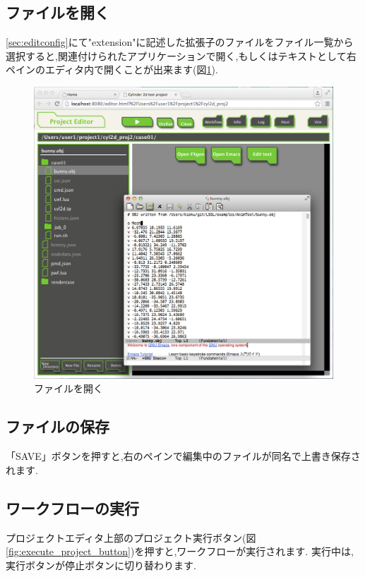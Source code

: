 \documentclass[a4paper,10pt,oneside]{jsbook}
\begin{document}
\newpage

\subsection{ファイルを開く}
\ref{sec:editconfig}にて"extension"に記述した拡張子のファイルをファイル一覧から選択すると,関連付けられたアプリケーションで開く,もしくはテキストとして右ペインのエディタ内で開くことが出来ます(図\ref{fig:projeditor_edit}).

\begin{figure}[H]
	\begin{center}
		\includegraphics[width=12.0cm]{image/launch_button_003.png}
	\end{center}
	\caption{ファイルを開く}
	\label{fig:projeditor_edit}
\end{figure}

\subsection{ファイルの保存}
「SAVE」ボタンを押すと,右のペインで編集中のファイルが同名で上書き保存されます.

\subsection{ワークフローの実行}
プロジェクトエディタ上部のプロジェクト実行ボタン(図\ref{fig:execute_project_button})を押すと,ワークフローが実行されます. 実行中は, 実行ボタンが停止ボタンに切り替わります.
\end{document}
